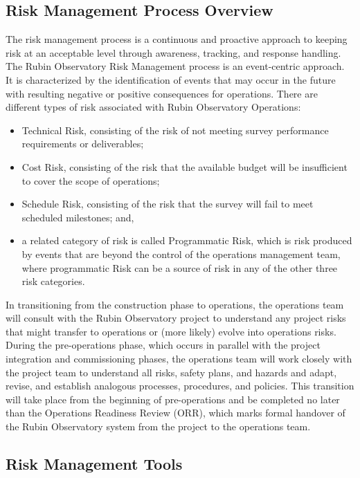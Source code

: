 \subsection{Risk Management Process Overview}

The risk management process is a continuous and proactive approach to keeping risk at an acceptable level through awareness, tracking, and response handling.
The Rubin Observatory Risk Management process is an event-centric approach.
It is characterized by the identification of events that may occur in the future with resulting negative or positive consequences for operations.
There are different types of risk associated with Rubin Observatory Operations:
\begin{itemize}
\item Technical Risk, consisting of the risk of not meeting survey performance requirements or deliverables;
\item Cost Risk, consisting of the risk that the available budget will be insufficient to cover the scope of operations;
\item Schedule Risk, consisting of the risk that the survey will fail to meet scheduled milestones; and,
\item a related category of risk is called Programmatic Risk, which is risk produced by events that are beyond the control of the operations management team, where programmatic Risk can be a source of risk in any of the other three risk categories. 
\end{itemize}

In transitioning from the construction phase to operations, the operations team will consult with the Rubin Observatory  project to understand any project risks that might transfer to operations or (more likely) evolve into operations risks.
During the pre-operations phase, which occurs in parallel with the project integration and commissioning phases, the operations team will work closely with the project team to understand all risks, safety plans, and hazards and adapt, revise, and establish analogous processes, procedures, and policies.
This transition will take place from the beginning of pre-operations and be completed no later than the Operations Readiness Review (ORR), which marks formal handover of the Rubin Observatory system from the project to the operations team.

\subsection{Risk Management Tools}

